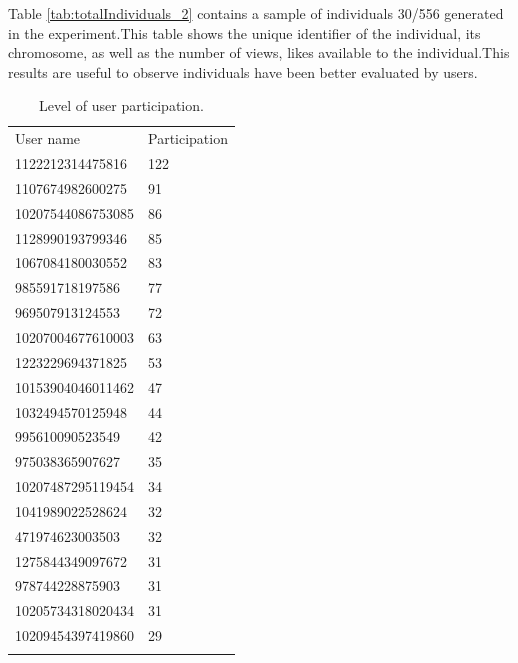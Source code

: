 Table \ref{tab:totalIndividuals_2} contains a sample of individuals 30/556
generated in the experiment.This table shows the unique identifier of the
individual, its chromosome, as well as the number of views, likes available to
the individual.This results are useful to observe individuals have been better
evaluated by users.

\begin{table}
\small
\caption{Level of user participation.}
\label{tab:userParticipation_2} 
\centering
\small
\begin{tabular}{p{4cm} p{4cm}}
\hline\noalign{\smallskip}
 User name & Participation   \\
\noalign{\smallskip}\hline\noalign{\smallskip}
\small{1122212314475816} & \small{122} \\ \hline 
\small{1107674982600275} & \small{91} \\ \hline 
\small{10207544086753085} & \small{86} \\ \hline 
\small{1128990193799346} & \small{85} \\ \hline 
\small{1067084180030552} & \small{83} \\ \hline 
\small{985591718197586} & \small{77} \\ \hline 
\small{969507913124553} & \small{72} \\ \hline 
\small{10207004677610003} & \small{63} \\ \hline 
\small{1223229694371825} & \small{53} \\ \hline 
\small{10153904046011462} & \small{47} \\ \hline 
\small{1032494570125948} & \small{44} \\ \hline 
\small{995610090523549} & \small{42} \\ \hline 
\small{975038365907627} & \small{35} \\ \hline
\small{10207487295119454} & \small{34} \\ \hline
\small{1041989022528624} & \small{32} \\ \hline
\small{471974623003503} & \small{32} \\ \hline
\small{1275844349097672} & \small{31} \\ \hline
\small{978744228875903} & \small{31} \\ \hline
\small{10205734318020434} & \small{31} \\ \hline
\small{10209454397419860} & \small{29} \\ \hline

    
\noalign{\smallskip}\hline
\end{tabular}
\end{table}

